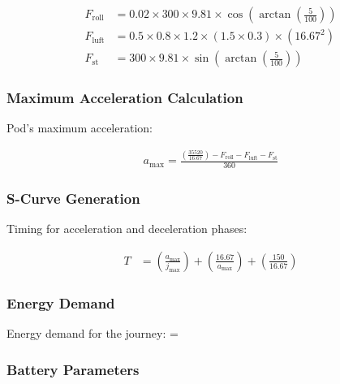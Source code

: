 \begin{align*}
F_{\text{roll}} &= 0.02 \times 300 \times 9.81 \times \cos\left(\arctan\left(\frac{5}{100}\right)\right) \\
F_{\text{luft}} &= 0.5 \times 0.8 \times 1.2 \times (1.5 \times 0.3) \times (16.67^2) \\
F_{\text{st}} &= 300 \times 9.81 \times \sin\left(\arctan\left(\frac{5}{100}\right)\right)
\end{align*}

\subsubsection*{Maximum Acceleration Calculation}

Pod's maximum acceleration:

\begin{align*}
a_{\text{max}} = \frac{\left(\frac{35520}{16.67}\right) - F_{\text{roll}} - F_{\text{luft}} - F_{\text{st}}}{360}
\end{align*}

\subsubsection*{S-Curve Generation}

Timing for acceleration and deceleration phases:

\begin{align*}
T &= \left(\frac{a_{\text{max}}}{j_{\text{max}}}\right) + \left(\frac{16.67}{a_{\text{max}}}\right) + \left(\frac{150}{16.67}\right)
\end{align*}

\subsubsection*{Energy Demand}

Energy demand for the journey:  = 

\subsubsection*{Battery Parameters}

